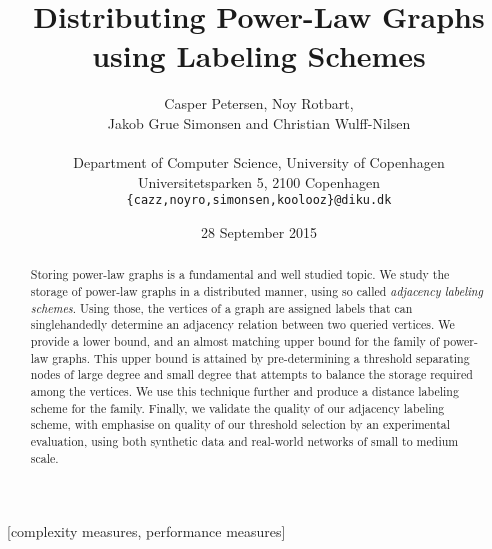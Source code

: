 \documentclass{acm_proc_article-sp}
\begin{document}
\title{Distributing Power-Law Graphs using Labeling Schemes}

\author{Casper Petersen, Noy Rotbart,\\ Jakob Grue Simonsen and Christian Wulff-Nilsen \\ \\
\small{Department of Computer Science, University of Copenhagen} \\
\small{Universitetsparken 5, 2100 Copenhagen}\\
 \small{\texttt{\{cazz,noyro,simonsen,koolooz\}@diku.dk}}  }
 

\date{28 September 2015}
\maketitle
\begin{abstract}
Storing  power-law graphs is a fundamental and  well studied topic.
We study the storage of  power-law graphs in a distributed manner,  using so called \emph{adjacency labeling schemes}.
Using those, the vertices of a graph are assigned labels that can singlehandedly determine an adjacency relation between two queried vertices. 
We  provide a lower bound, and  an almost matching  upper bound for the family of power-law graphs.
This upper bound is attained by pre-determining a threshold separating nodes of large degree and small degree that attempts to balance the storage required among the vertices. 
We use this technique further and produce a distance labeling scheme for the family.
Finally, we validate the quality of our adjacency labeling scheme, with emphasise  on quality of our threshold selection by  an experimental evaluation,  using both synthetic data and real-world networks of small to medium scale. 
\end{abstract}

[complexity measures, performance measures]











\newpage

  
\balancecolumns
\end{document}

